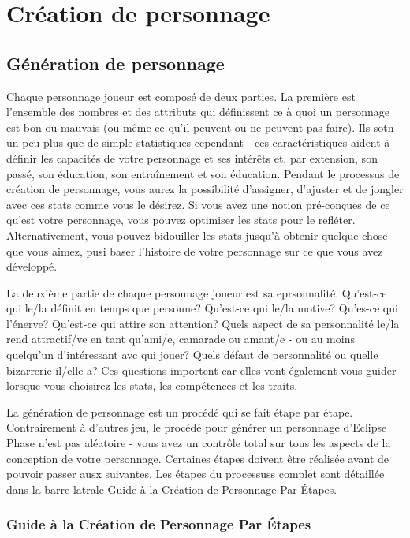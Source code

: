 \chapter{Création de personnage} \label{chap:character-creation} 

\section{Génération de personnage} \label{sec:character-creation} 

Chaque personnage joueur est composé de deux parties. La première est l'ensemble des nombres et des attributs qui définissent ce à quoi un personnage est bon ou mauvais (ou même ce qu'il peuvent ou ne peuvent pas faire). Ils sotn un peu plus que de simple statistiques cependant - ces caractéristiques aident à définir les capacités de votre personnage et ses intérêts et, par extension, son passé, son éducation, son entraînement et son éducation. Pendant le processus de création de personnage, vous aurez la possibilité d'assigner, d'ajuster et de jongler avec ces stats comme vous le désirez. Si vous avez une notion pré-conçues de ce qu'est votre personnage, vous pouvez optimiser les stats pour le refléter. Alternativement, vous pouvez bidouiller les stats jusqu'à obtenir quelque chose que vous aimez, pusi baser l'histoire de votre personnage sur ce que vous avez développé. 

La deuxième partie de chaque personnage joueur est sa eprsonnalité. Qu'est-ce qui le/la définit en temps que personne? Qu'est-ce qui le/la motive? Qu'es-ce qui l'énerve? Qu'est-ce qui attire son attention? Quels aspect de sa personnalité le/la rend attractif/ve en tant qu'ami/e, camarade ou amant/e - ou au moins quelqu'un d'intéressant avc qui jouer? Quels défaut de personnalité ou quelle bizarrerie il/elle a? Ces questions importent car elles vont également vous guider lorsque vous choisirez les stats, les compétences et les traits. 

La génération de personnage est un procédé qui se fait étape par étape. Contrairement à d'autres jeu, le procédé pour générer un personnage d'Eclipse Phase n'est pas aléatoire - vous avez un contrôle total sur tous les aspects de la conception de votre personnage. Certaines étapes doivent être réalisée avant de pouvoir passer ausx suivantes. Les étapes du processuss complet sont détaillée dans la barre latrale Guide à la Création de Personnage Par Étapes. 

\subsection{Guide à la Création de Personnage Par Étapes} 

